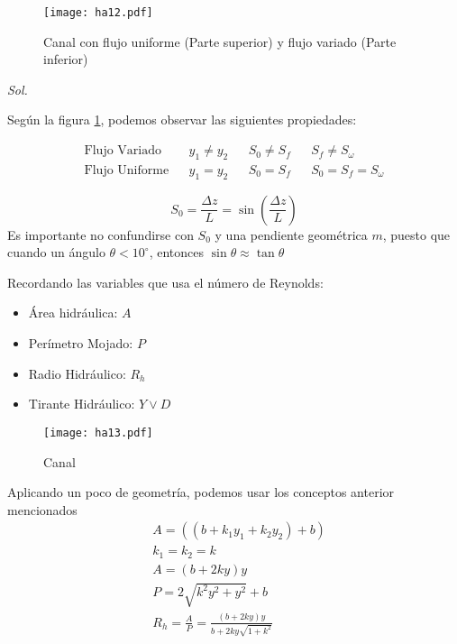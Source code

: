 \begin{example}
    \begin{figure}[h!]
    \centering
      \texttt{[image: ha12.pdf]}
      \caption{Canal con flujo uniforme (Parte superior) y flujo variado (Parte inferior)}
      \label{ha12}
    \end{figure}
\end{example}

\textit{ Sol. }

Según la figura \ref{ha12}, podemos observar las siguientes propiedades:

\begin{align*}
    \text{Flujo Variado}&&y_1 \neq y_2&& S_0\neq S_f&& S_f\neq S_{\omega}\\
    \text{Flujo Uniforme}&&y_1 = y_2&& S_0 = S_f&&S_0 = S_f = S_{\omega}
\end{align*}

\begin{definition}
    \begin{equation}
        S_0 = \frac{\Delta z}{L} = \sin{\left(\frac{\Delta z}{L}\right)} 
    \end{equation}
    Es importante no confundirse con $S_0$ y una pendiente geométrica $m$, puesto que cuando un ángulo $\theta< 10^{\circ}$, entonces $\sin{\theta}\approx \tan{\theta}$
\end{definition}
Recordando las variables que usa el número de Reynolds:
\begin{notation}
    \begin{itemize}
        \item Área hidráulica: $A$
        \item Perímetro Mojado: $P$
        \item Radio Hidráulico: $R_h$
        \item Tirante Hidráulico: $Y\lor D$
    \end{itemize}
\end{notation}

\begin{figure}[h!]
\centering
  \texttt{[image: ha13.pdf]}
  \caption{Canal}
  \label{ha13}
\end{figure}

Aplicando un poco de geometría, podemos usar los conceptos anterior mencionados
\begin{align*}
    &A=\left((b + k_1y_1 +k_2y_2) + b \right)\\
    &k_1 = k_2 = k\\
    &A = \left(b + 2ky\right)y\\
    &P = 2 \sqrt{k^2y^2 + y^2} + b\\
    &R_h = \frac{A}{P} =\frac{\left(b + 2ky\right)y}{b +2ky \sqrt{1 +k^2}}\\
\end{align*}
